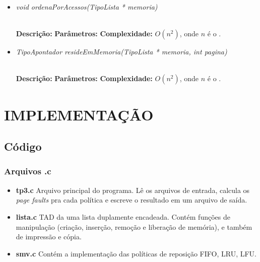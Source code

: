 \documentclass[12pt]{article}
\begin{document}
\vspace{0.2 true cm}

\begin{itemize}
 \item \begin{large}\textit{void ordenaPorAcessos(TipoLista * memoria)}\end{large}\\
 \subitem \textbf{Descrição:}
 \subitem \textbf{Parâmetros:}
 \subitem \textbf{Complexidade:} $O(n^2)$, onde $n$ é o .
\end{itemize}

\vspace{0.2 true cm}

\begin{itemize}
 \item \begin{large}\textit{TipoApontador resideEmMemoria(TipoLista * memoria, int pagina)}\end{large}\\
 \subitem \textbf{Descrição:}
 \subitem \textbf{Parâmetros:}
 \subitem \textbf{Complexidade:} $O(n^2)$, onde $n$ é o .
\end{itemize}


\section{IMPLEMENTAÇÃO}
\label{implementacao}

\subsection{Código}

\subsubsection{Arquivos .c}

\begin{itemize}
\item \textbf{tp3.c} Arquivo principal do programa. Lê os arquivos de entrada, calcula os \textit{page faults} pra cada política e escreve o resultado em um arquivo de saída.
\item \textbf{lista.c} TAD da uma lista duplamente encadeada. Contém funções de manipulação (criação, inserção, remoção e liberação de memória), e também de impressão e cópia.
\item \textbf{smv.c} Contém a implementação das políticas de reposição FIFO, LRU, LFU.
\end{itemize}
\end{document}
